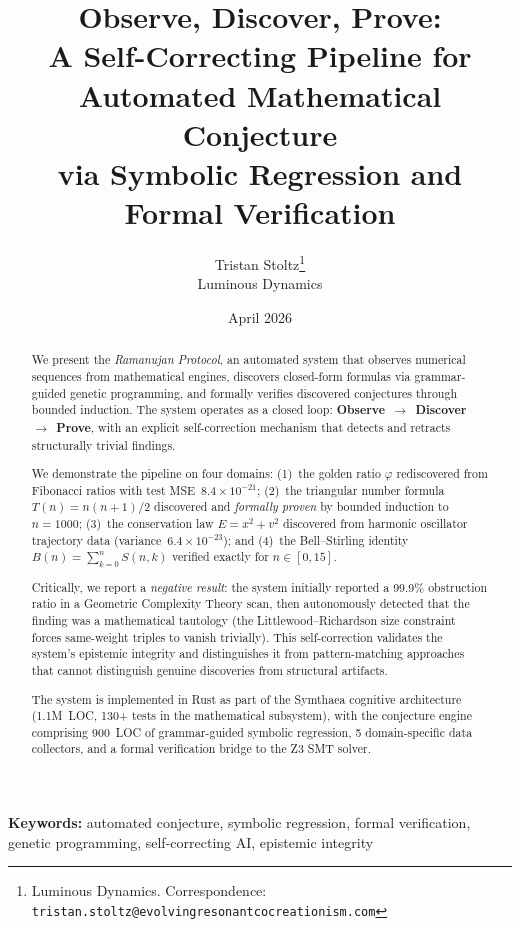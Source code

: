 \documentclass[11pt,a4paper]{article}
\title{%
  \textbf{Observe, Discover, Prove:}\\
  A Self-Correcting Pipeline for Automated Mathematical Conjecture\\
  via Symbolic Regression and Formal Verification
}
\author{
  Tristan Stoltz\thanks{Luminous Dynamics. Correspondence: \texttt{tristan.stoltz@evolvingresonantcocreationism.com}} \\
  Luminous Dynamics
}
\date{April 2026}
\begin{document}
\maketitle

\begin{abstract}
We present the \emph{Ramanujan Protocol}, an automated system that observes
numerical sequences from mathematical engines, discovers closed-form formulas
via grammar-guided genetic programming, and formally verifies discovered
conjectures through bounded induction. The system operates as a closed loop:
\textbf{Observe}~$\to$~\textbf{Discover}~$\to$~\textbf{Prove}, with an
explicit self-correction mechanism that detects and retracts structurally
trivial findings.

We demonstrate the pipeline on four domains: (1)~the golden ratio
$\varphi$ rediscovered from Fibonacci ratios with test MSE~$8.4 \times 10^{-21}$;
(2)~the triangular number formula $T(n) = n(n+1)/2$ discovered and
\emph{formally proven} by bounded induction to $n = 1000$; (3)~the
conservation law $E = x^2 + v^2$ discovered from harmonic oscillator
trajectory data (variance~$6.4 \times 10^{-23}$); and (4)~the Bell--Stirling
identity $B(n) = \sum_{k=0}^{n} S(n,k)$ verified exactly for $n \in [0, 15]$.

Critically, we report a \emph{negative result}: the system initially reported
a 99.9\% obstruction ratio in a Geometric Complexity Theory scan, then
autonomously detected that the finding was a mathematical tautology (the
Littlewood--Richardson size constraint forces same-weight triples to vanish
trivially). This self-correction validates the system's epistemic integrity
and distinguishes it from pattern-matching approaches that cannot distinguish
genuine discoveries from structural artifacts.

The system is implemented in Rust as part of the Symthaea cognitive
architecture (1.1M~LOC, 130+ tests in the mathematical subsystem), with the
conjecture engine comprising 900~LOC of grammar-guided symbolic regression,
5 domain-specific data collectors, and a formal verification bridge to the
Z3 SMT solver.
\end{abstract}

\textbf{Keywords:} automated conjecture, symbolic regression, formal verification,
genetic programming, self-correcting AI, epistemic integrity

\end{document}
